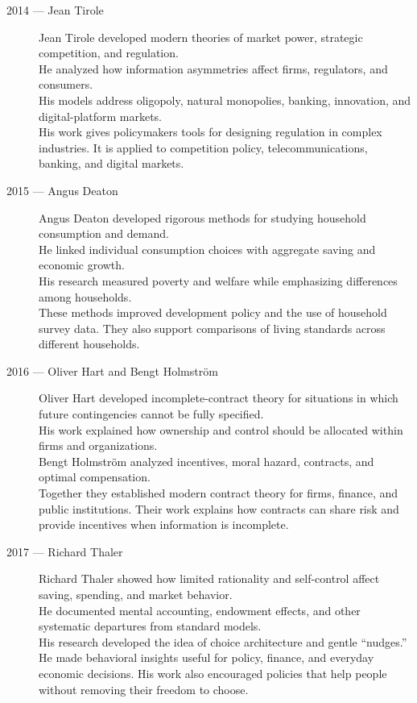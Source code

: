 \documentclass[12pt]{report}
\begin{document}
{\begin{description}
\item[2014 --- Jean Tirole]
Jean Tirole developed modern theories of market power, strategic competition, and regulation.\\
He analyzed how information asymmetries affect firms, regulators, and consumers.\\
His models address oligopoly, natural monopolies, banking, innovation, and digital-platform markets.\\
His work gives policymakers tools for designing regulation in complex industries. It is applied to competition policy, telecommunications, banking, and digital markets.

\item[2015 --- Angus Deaton]
Angus Deaton developed rigorous methods for studying household consumption and demand.\\
He linked individual consumption choices with aggregate saving and economic growth.\\
His research measured poverty and welfare while emphasizing differences among households.\\
These methods improved development policy and the use of household survey data. They also support comparisons of living standards across different households.

\item[2016 --- Oliver Hart and Bengt Holmström]
Oliver Hart developed incomplete-contract theory for situations in which future contingencies cannot be fully specified.\\
His work explained how ownership and control should be allocated within firms and organizations.\\
Bengt Holmström analyzed incentives, moral hazard, contracts, and optimal compensation.\\
Together they established modern contract theory for firms, finance, and public institutions. Their work explains how contracts can share risk and provide incentives when information is incomplete.

\item[2017 --- Richard Thaler]
Richard Thaler showed how limited rationality and self-control affect saving, spending, and market behavior.\\
He documented mental accounting, endowment effects, and other systematic departures from standard models.\\
His research developed the idea of choice architecture and gentle ``nudges.''\\
He made behavioral insights useful for policy, finance, and everyday economic decisions. His work also encouraged policies that help people without removing their freedom to choose.


\end{description}}
\end{document}
